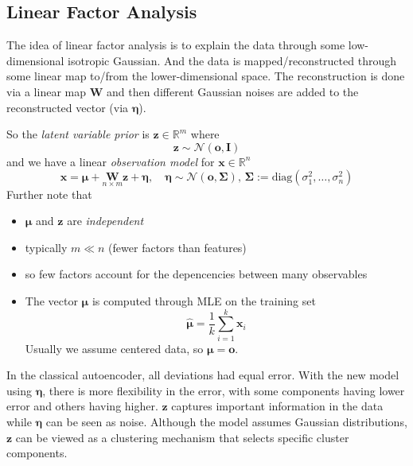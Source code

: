 \documentclass[a2paper,4pt]{extarticle}
\newcommand{\R}{\mathbb{R}}
\newcommand{\cN}{\mathcal{N}}
\newcommand{\diag}{\text{diag}}
\newcommand{\mat}[1]{\mathbf{#1}}
\renewcommand{\vec}[1]{\mathbf{#1}}
\newcommand{\vo}{\vec{o}}
\newcommand{\vx}{\vec{x}}
\newcommand{\vz}{\vec{z}}
\newcommand{\veta}{\boldsymbol{\eta}}
\newcommand{\vmu}{\boldsymbol{\mu}}
\newcommand{\MI}{\mat{I}}
\newcommand{\MW}{\mat{W}}
\newcommand{\MSigma}{\mat{\Sigma}}
\begin{document}
\begin{landscape}
\begin{multicols*}{7}
\subsection{Linear Factor Analysis}

The idea of linear factor analysis is to explain the data through some
low-dimensional isotropic Gaussian. And the data is mapped/reconstructed through
some linear map to/from the lower-dimensional space. The reconstruction is done
via a linear map $\MW$ and then different Gaussian noises are added to the
reconstructed vector (via $\veta$).

So the \emph{latent variable prior} is $\vz\in\R^m$ where
\[
\vz\sim\cN(\vo,\MI)
\]
and we have a linear \emph{observation model} for $\vx\in\R^n$
\[
\vx=\vmu+\underset{n\times m}{\MW}\vz +\veta,
\quad
\veta\sim\cN(\vo,\MSigma),
\,
\MSigma:=\diag(\sigma_1^2,\ldots,\sigma_n^2)
\]
Further note that
\begin{itemize}
  \item $\vmu$ and $\vz$ are \emph{independent}
  \item typically $m\ll n$ (fewer factors than features)
  \item so few factors account for the depencencies between many observables
  \item The vector $\vmu$ is computed through MLE on the training set
  \[
  \hat{\vmu}=\frac{1}{k}\sum_{i=1}^k\vx_i
  \]
  Usually we assume centered data, so $\vmu=\vo$.
\end{itemize}




In the classical autoencoder, all deviations had equal error. With the new model
using $\veta$, there is more flexibility in the error, with some components having
lower error and others having higher. $\vz$ captures important information in the 
data while $\veta$ can be seen as noise. Although the model assumes Gaussian distributions,
$\vz$ can be viewed as a clustering mechanism that selects specific cluster components.


\end{multicols*}
\end{landscape}
\end{document}
